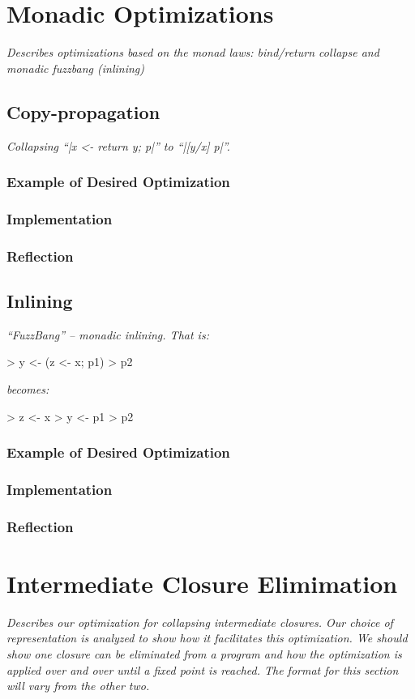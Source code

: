 \documentclass[12pt]{report}
\begin{document}
\chapter{Monadic Optimizations}
\emph{Describes optimizations based on the monad laws: bind/return collapse and
  monadic fuzzbang (inlining)}

\section{Copy-propagation}
\emph{Collapsing ``|x <- return y; p|'' to ``|[y/x] p|''.}
\subsection{Example of Desired Optimization}
\subsection{Implementation}
\subsection{Reflection}

\section{Inlining}
\emph{``FuzzBang'' --  monadic inlining. That is:}

> y <- (z <- x; p1)
> p2

\noindent
\emph{becomes:}

> z <- x
> y <- p1
> p2

\subsection{Example of Desired Optimization}
\subsection{Implementation}
\subsection{Reflection}

\chapter{Intermediate Closure Elimimation}
\emph{Describes our optimization for collapsing intermediate
closures. Our choice of representation is analyzed to
show how it facilitates this optimization. We should show one
closure can be eliminated from a program and how the optimization
is applied over and over until a fixed point is reached. The format
for this section will vary from the other two.}
\end{document}
